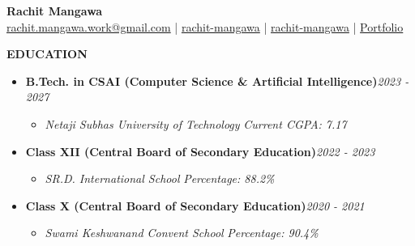 \documentclass[10pt]{article}
\newcommand{\resheading}[1]{{\small \colorbox{mygrey}{\begin{minipage}{\dimexpr\textwidth-2\fboxsep\relax}\textbf{#1 \vphantom{p\^{E}}}\end{minipage}}}}
\begin{document}
\noindent
\begin{minipage}{1.0\linewidth}
    \centering
    {\huge\bfseries Rachit Mangawa}\\[3pt]
    {
  \href{mailto:rachit.mangawa.work@gmail.com}{rachit.mangawa.work@gmail.com} |
     \href{https://www.linkedin.com/in/rachit-mangawa/}{rachit-mangawa} |
     \href{https://github.com/rachit-mangawa}{rachit-mangawa} | 
    \href{https://rachit-mangawa.github.io/rachit-mangawa/}{Portfolio}}
\end{minipage}

\vspace{4pt}

\noindent
\resheading{EDUCATION}
\begin{itemize}[leftmargin=*]\small
\item \textbf{B.Tech. in CSAI (Computer Science \& Artificial Intelligence)}\hfill \textit{2023 - 2027}
\begin{itemize}[noitemsep, leftmargin=*, label=-]\footnotesize
\item \textit{Netaji Subhas University of Technology} \hfill \textit{Current CGPA: 7.17}
\end{itemize}
\end{itemize}

\begin{itemize}[leftmargin=*]\small
\item \textbf{Class XII (Central Board of Secondary Education)}\hfill \textit{2022 - 2023}
\begin{itemize}[noitemsep, leftmargin=*, label=-]\footnotesize
\item \textit{SR.D. International School} \hfill \textit{Percentage: 88.2\%}
\end{itemize}
\end{itemize}

\begin{itemize}[leftmargin=*]\small
\item \textbf{Class X (Central Board of Secondary Education)}\hfill \textit{2020 - 2021}
\begin{itemize}[noitemsep, leftmargin=*, label=-]\footnotesize
\item \textit{Swami Keshwanand Convent School} \hfill \textit{Percentage: 90.4\%}
\end{itemize}
\end{itemize}
\end{document}

